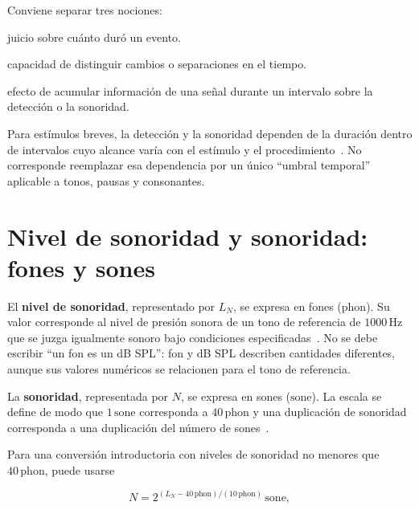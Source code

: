 Conviene separar tres nociones:

\begin{description}[style=nextline]
    \item[\textbf{Duración percibida:}]
    juicio sobre cuánto duró un evento.

    \item[\textbf{Resolución temporal:}]
    capacidad de distinguir cambios o separaciones en el tiempo.

    \item[\textbf{Integración temporal:}]
    efecto de acumular información de una señal durante un intervalo sobre la
    detección o la sonoridad.
\end{description}

Para estímulos breves, la detección y la sonoridad dependen de la
duración dentro de intervalos cuyo alcance varía con el estímulo y el
procedimiento~\cite{oxenham2018}. No corresponde reemplazar esa dependencia por un único
``umbral temporal'' aplicable a tonos, pausas y consonantes.

\section{Nivel de sonoridad y sonoridad: fones y sones}
\label{sec:u7-fones-sones}

El \textbf{nivel de sonoridad}, representado por \(L_N\), se expresa en fones
(\(\text{phon}\)). Su valor corresponde al nivel de presión sonora de
un tono de referencia de \(1000\,\text{Hz}\) que se juzga igualmente sonoro
bajo condiciones especificadas~\cite{asaPhon}. No se debe escribir ``un fon es un dB SPL'':
fon y dB SPL describen cantidades diferentes, aunque sus valores numéricos se
relacionen para el tono de referencia.

La \textbf{sonoridad}, representada por \(N\), se expresa en sones
(\(\text{sone}\)). La escala se define de modo que
\(1\,\text{sone}\) corresponda a \(40\,\text{phon}\) y una duplicación de
sonoridad corresponda a una duplicación del número de sones~\cite{asaSone}.

Para una conversión introductoria con niveles de sonoridad no menores
que \(40\,\text{phon}\), puede usarse~\cite{asaSone}

\begin{equation}
    N
      =2^{(L_N-40\,\text{phon})/(10\,\text{phon})}
        \,\text{sone},
    \label{eq:u7-fones-sones}
\end{equation}

